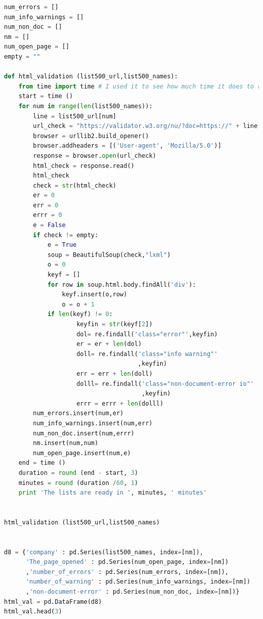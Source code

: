 \documentclass{article}
\begin{document}
\begin{lstlisting}[language=Python]
num_errors = []
num_info_warnings = []
num_non_doc = [] 
nm = []
num_open_page = []
empty = ""
 
def html_validation (list500_url,list500_names):
    from time import time # I used it to see how much time it does to run the function
    start = time ()
    for num in range(len(list500_names)):
        line = list500_url[num] 
        url_check = "https://validator.w3.org/nu/?doc=https://" + line
        browser = urllib2.build_opener()
        browser.addheaders = [('User-agent', 'Mozilla/5.0')]
        response = browser.open(url_check)
        html_check = response.read()
        html_check
        check = str(html_check)
        er = 0
        err = 0
        errr = 0
        e = False
        if check != empty:
            e = True
            soup = BeautifulSoup(check,"lxml")
            o = 0
            keyf = []
            for row in soup.html.body.findAll('div'):
                keyf.insert(o,row)
                o = o + 1                    
            if len(keyf) != 0:       
                    keyfin = str(keyf[2])                     
                    dol= re.findall('class="error"',keyfin)            
                    er = er + len(dol)
                    doll= re.findall('class="info warning"'
                                     ,keyfin)            
                    err = err + len(doll)
                    dolll= re.findall('class="non-document-error io"'
                                      ,keyfin)            
                    errr = errr + len(dolll)
        num_errors.insert(num,er)
        num_info_warnings.insert(num,err)
        num_non_doc.insert(num,errr)  
        nm.insert(num,num) 
        num_open_page.insert(num,e)
    end = time ()
    duration = round (end - start, 3)
    minutes = round (duration /60, 1)
    print 'The lists are ready in ', minutes, ' minutes'
 

html_validation (list500_url,list500_names)
 

d8 = {'company' : pd.Series(list500_names, index=[nm]),
      'The_page_opened' : pd.Series(num_open_page, index=[nm])
      ,'number_of_errors' : pd.Series(num_errors, index=[nm]),
      'number_of_warning' : pd.Series(num_info_warnings, index=[nm])
      ,'non-document-error' : pd.Series(num_non_doc, index=[nm])}
html_val = pd.DataFrame(d8)    
html_val.head(3) 
\end{lstlisting}
\end{document}
